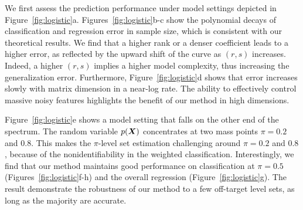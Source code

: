 \documentclass[11pt]{article}
\theoremstyle{definition}
\begin{document}
We first assess the prediction performance under model settings depicted in Figure~\ref{fig:logistic}a. 
Figures~\ref{fig:logistic}b-c show the polynomial decays of classification and regression error in sample size, which is consistent with our theoretical results. We find that a higher rank or a denser coefficient leads to a higher error, as reflected by the upward shift of the curve as $(r,s)$ increases. Indeed, a higher $(r,s)$ implies a higher model complexity, thus increasing the generalization error. 
Furthermore, Figure~\ref{fig:logistic}d shows that error increases slowly with matrix dimension in a near-log rate. The ability to effectively control massive noisy features highlights the benefit of our method in high dimensions. 

Figure~\ref{fig:logistic}e shows a model setting that falls on the other end of the spectrum. The random variable $p(\bm X)$ concentrates at two mass points $\pi=0.2$ and $0.8$. This makes the $\pi$-level set estimation challenging around $\pi=0.2$ and $0.8$, because of the nonidentifiability in the weighted classification. Interestingly, we find that our method maintains good performance on classification at $\pi=0.5$ (Figures~\ref{fig:logistic}f-h) and the overall regression (Figure~\ref{fig:logistic}g). The result demonstrate the robustness of our method to a few off-target level sets, as long as the majority are accurate.
\end{document}
